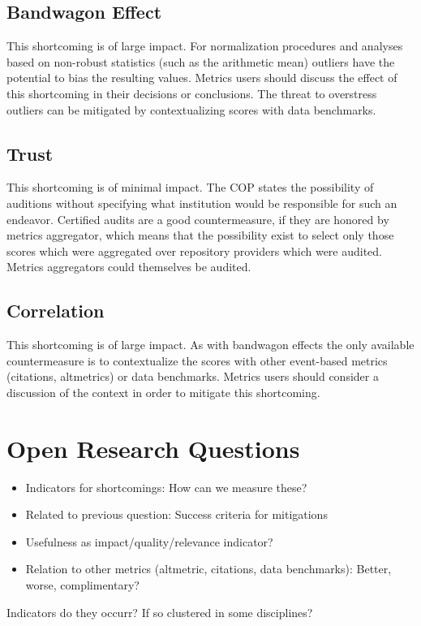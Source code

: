 \documentclass[conference, a4paper]{IEEEtran}\usepackage[]{graphicx}\usepackage[]{color}
\begin{document}
\subsection{Bandwagon Effect}
This shortcoming is of large impact.
For normalization procedures and analyses based on non-robust statistics
(such as the arithmetic mean) outliers have the potential to bias the resulting values.
Metrics users should discuss the effect of this shortcoming in their decisions or
conclusions.
The threat to overstress outliers can be mitigated by contextualizing scores
with data benchmarks.

\subsection{Trust}
This shortcoming is of minimal impact.
The COP states the possibility of auditions without specifying what institution would be
responsible for such an endeavor.
Certified audits are a good countermeasure, if they are honored by metrics aggregator,
which means that the possibility exist to select only those scores which were aggregated
over repository providers which were audited.
Metrics aggregators could themselves be audited.

\subsection{Correlation}
This shortcoming is of large impact.
As with bandwagon effects the only available countermeasure is to contextualize the scores
with other event-based metrics (citations, altmetrics) or data benchmarks.
Metrics users should consider a discussion of the context in order to mitigate this shortcoming.

\section{Open Research Questions}\label{sec:questions}


\begin{itemize}
        \item Indicators for shortcomings: How can we measure these?
        \item Related to previous question: Success criteria for mitigations
        \item Usefulness as impact/quality/relevance indicator?
        \item Relation to other metrics (altmetric, citations, data benchmarks):
            Better, worse, complimentary?
\end{itemize}
Indicators do they occurr? If so clustered in some disciplines?
\end{document}
